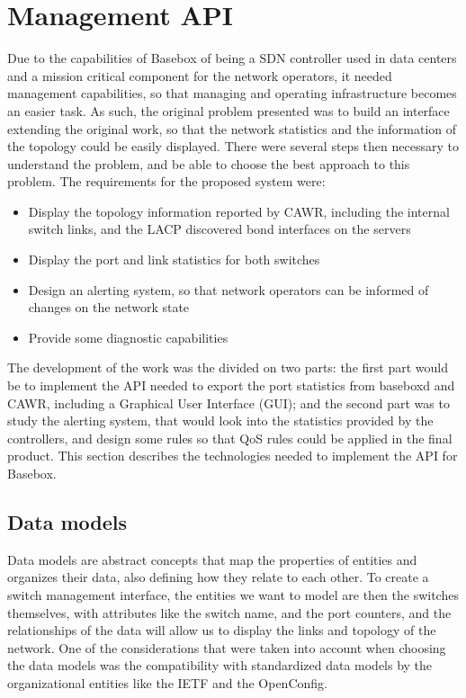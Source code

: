 \chapter {Management API}

Due to the capabilities of Basebox of being a SDN controller used in data centers and a mission critical component for the network operators, it needed management
capabilities, so that managing and operating infrastructure becomes an easier task. As such, the original problem presented was to build an interface extending the
original work, so that the network statistics and the information of the topology could be easily displayed. There were several steps then necessary to understand
the problem, and be able to choose the best approach to this problem. The requirements for the proposed system were:

\begin {itemize}
    \item Display the topology information reported by CAWR, including the internal switch links, and the LACP discovered bond interfaces on the servers
    \item Display the port and link statistics for both switches
    \item Design an alerting system, so that network operators can be informed of changes on the network state
    \item Provide some diagnostic capabilities
\end {itemize}

\par The development of the work was the divided on two parts: the first part would be to implement the API needed to export the port statistics from baseboxd and
CAWR, including a Graphical User Interface (GUI); and the second part was to study the alerting system, that would look into the statistics provided by the
controllers, and design some rules so that QoS rules could be applied in the final product. This section describes the technologies needed to implement the API for
Basebox.

\section {Data models}

Data models are abstract concepts that map the properties of entities and organizes their data, also defining how they relate to each other. To create a switch 
management interface, the entities we want to model are then the switches themselves, with attributes like the switch name, and the port counters, and the 
relationships of the data will allow us to display the links and topology of the network. One of the considerations that were taken into account when choosing the
data models was the compatibility with standardized data models by the organizational entities like the IETF and the OpenConfig. 

